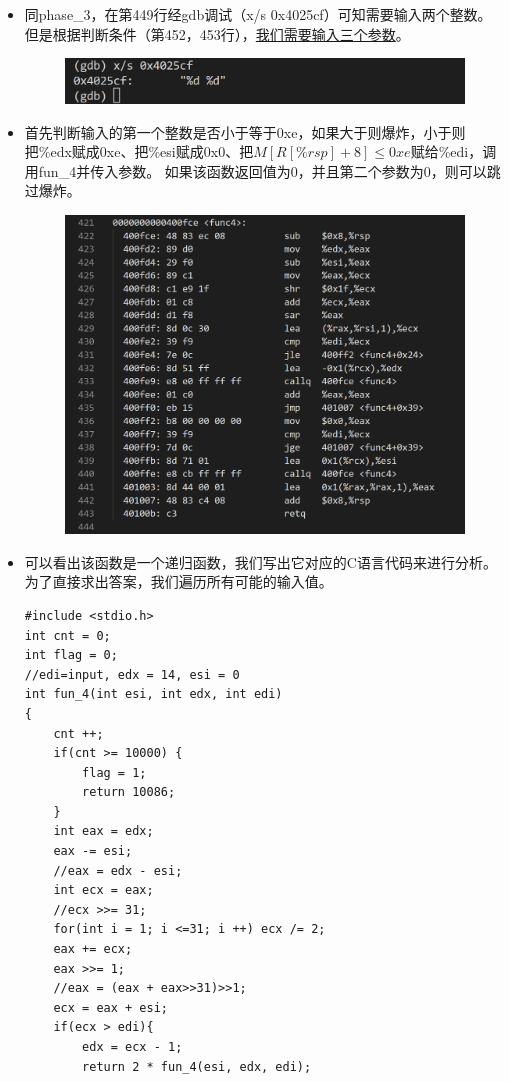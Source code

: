 \documentclass[12pt, a4paper, oneside]{ctexart}
\begin{document}
\begin{itemize}
    \item 同phase\_3，在第449行经gdb调试（x/s 0x4025cf）可知需要输入两个整数。但是根据判断条件（第452，453行），\underline{我们需要输入三个参数}。
    \begin{figure}[htbp]
        \includegraphics[scale=0.55]{image/2.5-2.png}
    \end{figure}    
    \item 首先判断输入的第一个整数是否小于等于0xe，如果大于则爆炸，小于则把\%edx赋成0xe、把\%esi赋成0x0、把$M[R[\%rsp] + 8]\le 0xe$赋给\%edi，调用fun\_4并传入参数。
    如果该函数返回值为0，并且第二个参数为0，则可以跳过爆炸。
    \begin{figure}[htbp]
        \includegraphics[scale=0.45]{image/2.5-3.png}
    \end{figure}  
    \item 可以看出该函数是一个递归函数，我们写出它对应的C语言代码来进行分析。为了直接求出答案，我们遍历所有可能的输入值。
\begin{lstlisting}
#include <stdio.h>
int cnt = 0;
int flag = 0; 
//edi=input, edx = 14, esi = 0
int fun_4(int esi, int edx, int edi)
{
    cnt ++;
    if(cnt >= 10000) {
        flag = 1;
        return 10086;
    }
    int eax = edx;
    eax -= esi;
    //eax = edx - esi;
    int ecx = eax;
    //ecx >>= 31;
    for(int i = 1; i <=31; i ++) ecx /= 2;
    eax += ecx;
    eax >>= 1;
    //eax = (eax + eax>>31)>>1;
    ecx = eax + esi;
    if(ecx > edi){
        edx = ecx - 1;
        return 2 * fun_4(esi, edx, edi);


\end{lstlisting}
\end{itemize}
\end{document}

